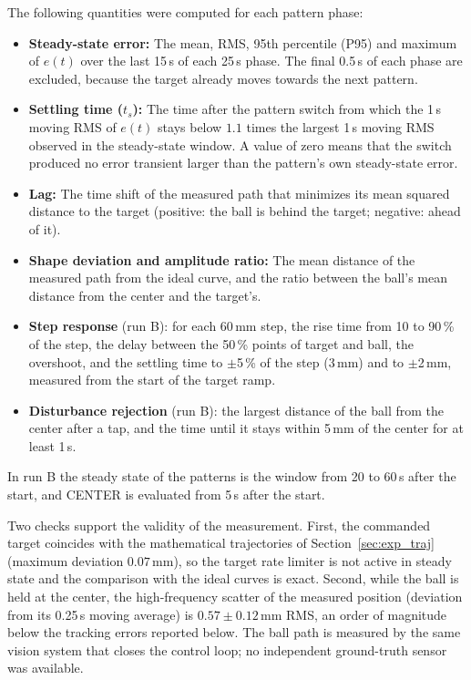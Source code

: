\documentclass[12pt,a4paper]{report}
\begin{document}
The following quantities were computed for each pattern phase:
\begin{itemize}
    \item \textbf{Steady-state error:} The mean, RMS, 95th percentile (P95) and maximum of $e(t)$ over the last 15\,s of each 25\,s phase. The final 0.5\,s of each phase are excluded, because the target already moves towards the next pattern.
    \item \textbf{Settling time ($t_s$):} The time after the pattern switch from which the 1\,s moving RMS of $e(t)$ stays below $1.1$ times the largest 1\,s moving RMS observed in the steady-state window. A value of zero means that the switch produced no error transient larger than the pattern's own steady-state error.
    \item \textbf{Lag:} The time shift of the measured path that minimizes its mean squared distance to the target (positive: the ball is behind the target; negative: ahead of it).
    \item \textbf{Shape deviation and amplitude ratio:} The mean distance of the measured path from the ideal curve, and the ratio between the ball's mean distance from the center and the target's.
    \item \textbf{Step response} (run B): for each 60\,mm step, the rise time from 10 to 90\,\% of the step, the delay between the 50\,\% points of target and ball, the overshoot, and the settling time to $\pm$5\,\% of the step (3\,mm) and to $\pm$2\,mm, measured from the start of the target ramp.
    \item \textbf{Disturbance rejection} (run B): the largest distance of the ball from the center after a tap, and the time until it stays within 5\,mm of the center for at least 1\,s.
\end{itemize}

In run B the steady state of the patterns is the window from 20 to 60\,s after the start, and CENTER is evaluated from 5\,s after the start.

Two checks support the validity of the measurement. First, the commanded target coincides with the mathematical trajectories of Section~\ref{sec:exp_traj} (maximum deviation $0.07$\,mm), so the target rate limiter is not active in steady state and the comparison with the ideal curves is exact. Second, while the ball is held at the center, the high-frequency scatter of the measured position (deviation from its 0.25\,s moving average) is $0.57 \pm 0.12$\,mm RMS, an order of magnitude below the tracking errors reported below. The ball path is measured by the same vision system that closes the control loop; no independent ground-truth sensor was available.
\end{document}
